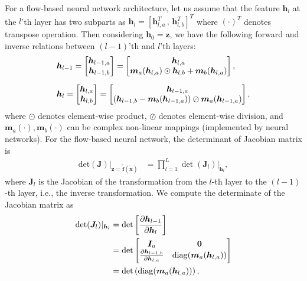 For a flow-based neural network architecture, let us assume that
the feature $\bm{h}_l$ at the $l$'th layer has two subparts as
$\bm{h}_l = [\bm{h}_{l,a}^{T} \, , \, \bm{h}_{l,b}^{T}]^{T}$ where
$(\cdot)^{T}$ denotes transpose operation. Then considering $\bm{h}_0 = \bm{z}$, we have the following forward and inverse relations between $(l-1)$'th and $l$'th layers:
\begin{equation}\label{eq-gl}
  \begin{array}{l}
    \bm{h}_{l-1} =
    \begin{bmatrix}
      \bm{h}_{l-1,a}\\
      \bm{h}_{l-1,b}
    \end{bmatrix}
    =
    \begin{bmatrix}
      \bm{h}_{l,a}\\
      \bm{m}_a(\bm{h}_{l,a})\odot \bm{h}_{l,b} + \bm{m}_b(\bm{h}_{l,a})
    \end{bmatrix},\vspace{10pt}\\
    \bm{h}_{l} =
    \begin{bmatrix}
      \bm{h}_{l,a}\\
      \bm{h}_{l,b}
    \end{bmatrix}
    =
    \begin{bmatrix}
      \bm{h}_{l-1,a}\\
      \left(  \bm{h}_{l-1,b} - \bm{m}_b(\bm{h}_{l-1,a}) \right)\oslash \bm{m}_a(\bm{h}_{l-1,a}) 
    \end{bmatrix}, \\
  \end{array}  
\end{equation}
where $\odot$ denotes element-wise product, $\oslash$ denotes
element-wise division, and $\bm{m}_a(\cdot), \bm{m}_b(\cdot)$ can be
complex non-linear mappings (implemented by neural networks).
For the flow-based neural network, the determinant of Jacobian matrix is
\begin{equation}
  \begin{array}{rl}
    \mathrm{det}(\bm{J}) |_{\bm{z}=\tilde{\bm{f}}(\tilde{\bm{x}})} & = \prod_{l=1}^L \det (\bm{J}_l) |_{\bm{h}_{l}},
  \end{array}
\end{equation}
where $\bm{J}_l$ is the Jacobian of the transformation from the $l$-th layer to the $(l-1)$-th layer, i.e., the inverse transformation. We compute the determinate of the Jacobian matrix as
\begin{align}\label{eq-hl-determinate}
  \det (\bm{J}_l)|_{\bm{h}_{l}}& = \det \left[  \frac{ \partial \bm{h}_{l-1}}{\partial \bm{h}_l} \right] \nonumber\\
                               & = \det
                                 \begin{bmatrix}
                                   \bm{I}_a & \mathbf{0} \nonumber\\
                                   \frac{ \partial \bm{h}_{l-1,b}}{\partial \bm{h}_{l,a}} & \mathrm{diag}(\bm{m}_a(\bm{h}_{l,a}))
                                 \end{bmatrix}\nonumber\\
                               &= \det \left( \mathrm{diag}(\bm{m}_a(\bm{h}_{l,a})) \right),
\end{align}

